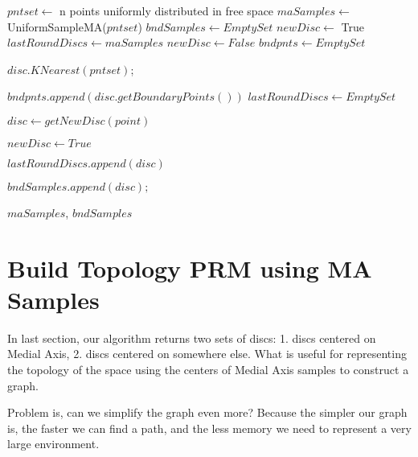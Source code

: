 \documentclass[12pt]{article}
\begin{document}
  \begin{algorithmic}[1]
    \State $pntset \gets$ n points uniformly distributed in free space
  	\State $maSamples \gets$ UniformSampleMA($pntset$) 
  	\State $bndSamples \gets EmptySet$ 
  	\State $newDisc \gets$ True	
  	\State $lastRoundDiscs \gets maSamples$
  		\State $newDisc \gets False$
		\State $bndpnts \gets EmptySet$   		
  		
  			\indent\indent $disc.KNearest(pntset)$; 
  			
  			\indent\indent $bndpnts.append( disc.getBoundaryPoints() )$
  		\EndFor
  		\State $lastRoundDiscs \gets EmptySet$
  		
  			 
  				\indent\indent\indent $disc \gets getNewDisc(point)$ 
  				
  					\indent\indent\indent\indent $newDisc \gets True$
  					
  					\indent\indent\indent\indent $lastRoundDiscs.append( disc )$
  					
  					\indent\indent\indent\indent $bndSamples.append(disc);$
  				\EndIf
  			\EndIf
  			
  		\EndFor
  	\EndWhile
  	
  	\Return $maSamples$, $bndSamples$
  \EndFunction
  \end{algorithmic}
  
  \section{Build Topology PRM using MA Samples}
  In last section, our algorithm returns two sets of discs: 1. discs centered on Medial Axis, 2. discs centered on somewhere else. What is useful for representing the topology of the space using the centers of Medial Axis samples to construct a graph. 
  
  Problem is, can we simplify the graph even more? Because the simpler our graph is, the faster we can find a path, and the less memory we need to represent a very large environment. 
  
\end{document}
